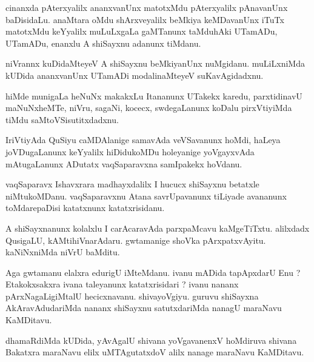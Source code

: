 \documentclass{article}
\begin{document}
\begin{mn}
cinanxda  pAterxyalilx  ananxvanUnx  matotxMdu  pAterxyalilx  pAnavanUnx  baDisidaLu.  anaMtara  
oMdu  shArxveyalilx  beMkiya  keMDavanUnx  iTuTx  matotxMdu  keYyalilx  muLuLxgaLa  gaMTanunx  
taMduhAki  UTamADu,  UTamADu,  enanxlu  A  shiSayxnu  adanunx  tiMdanu.
\end{mn}

\begin{mn}
niVrannx  kuDidaMteyeV  A  shiSayxnu  beMkiyanUnx  nuMgidanu.  muLiLxniMda  kUDida  ananxvanUnx  
UTamADi  modalinaMteyeV  suKavAgidadxnu.
\end{mn}

\begin{mn}
hiMde  munigaLa  heNuNx makakxLu  Itananunx  UTakekx  karedu,  parxtidinavU  maNuNxheMTe,  niVru,  
sagaNi,  kocecx,  swdegaLanunx  koDalu  pirxVtiyiMda  tiMdu  saMtoVSisutitxdadxnu.
\end{mn}

\begin{mn}
IriVtiyAda  QuSiyu  caMDAlanige  samavAda  veVSavanunx  hoMdi,  haLeya  joVDugaLanunx  keYyalilx  
hiDidukoMDu  holeyanige  yoVgayxvAda  mAtugaLanunx  ADutatx  vaqSaparavxna  samIpakekx  hoVdanu.
\end{mn}

\begin{mn}
vaqSaparavx  Ishavxrara  madhayxdalilx  I  hucucx  shiSayxnu  betatxle  niMtukoMDanu.  vaqSaparavxnu  
Atana  savrUpavanunx  tiLiyade  avananunx  toMdarepaDisi  katatxnunx  katatxrisidanu.
\end{mn}

\begin{mn}
A  shiSayxnanunx  kolalxlu  I  carAcaravAda  parxpaMcavu  kaMgeTiTxtu.  alilxdadx  QusigaLU,  
kAMtihiVnarAdaru.  gwtamanige  shoVka pArxpatxvAyitu.  kaNiNxniMda  niVrU  baMditu.
\end{mn}

\begin{mn}
Aga  gwtamanu  elalxra  edurigU  iMteMdanu.  ivanu  mADida  tapApxdarU  Enu ?  Etakokxsakxra  ivana  
taleyanunx  katatxrisidari ?  ivanu  nananx  pArxNagaLigiMtalU  hecicxnavanu.  shivayoVgiyu.  guruvu  
shiSayxna  AkAravAdudariMda  nananx  shiSayxnu  satutxdariMda  nanagU  maraNavu  KaMDitavu.
\end{mn}

\begin{mn}
dhamaRdiMda  kUDida,  yAvAgalU  shivana  yoVgavanenxV  hoMdiruva  shivana  Bakatxra  maraNavu  elilx  
uMTAgutatxdoV  alilx  nanage  maraNavu  KaMDitavu.
\end{mn}
\end{document}
